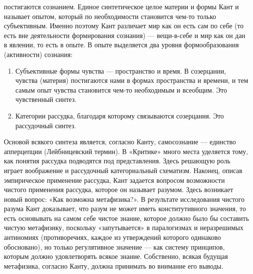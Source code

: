 \documentclass[12pt]{article}
\begin{document}
постигаются сознанием. Единое синтетическое целое материи и формы Кант и называет опытом, который по
необходимости становится чем-то только субъективным. Именно поэтому Кант различает мир как он есть сам
по себе (то есть вне деятельности формирования сознания) — вещи-в-себе и мир как он дан в явлении, то есть в
опыте. В опыте выделяется два уровня формообразования (активности) сознания:
\begin{enumerate}
\item Субъективные формы
чувства — пространство и время. В созерцании, чувства (материя) постигаются нами в формах пространства и
времени, и тем самым опыт чувства становится чем-то необходимым и всеобщим. Это чувственный синтез.

\item
Категории рассудка, благодаря которому связываются созерцания. Это рассудочный синтез.
\end{enumerate}
Основой всякого
синтеза  является,  согласно  Канту,  самосознание  —  единство  апперцепции  (Лейбницевский  термин).  В
«Критике» много места уделяется тому, как понятия рассудка подводятся под представления. Здесь решающую
роль играет воображение и рассудочный категориальный схематизм. Наконец, описав эмпирическое применение
рассудка, Кант задается вопросом возможности чистого применения рассудка, которое он называет разумом.
Здесь возникает новый вопрос: «Как возможна метафизика?». В результате исследования чистого разума Кант
доказывает, что разум не может иметь конститутивного значения, то есть основывать на самом себе чистое
знание, которое должно было бы составить чистую метафизику, поскольку «запутывается» в паралогизмах и
неразрешимых антиномиях (противоречиях, каждое из утверждений которого одинаково обосновано), но только
регулятивное значение — как систему принципов, которым должно удовлетворять всякое знание. Собственно,
всякая будущая метафизика, согласно Канту, должна принимать во внимание его выводы.
\end{document}
